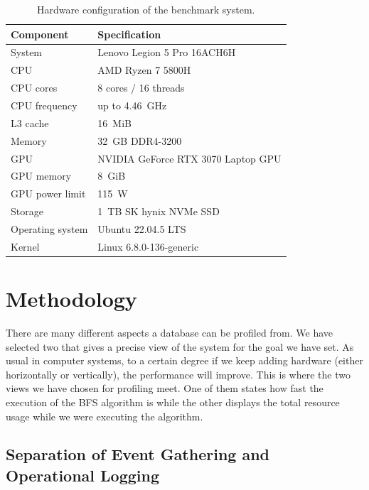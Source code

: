 \documentclass[11pt,a4paper]{article}
\begin{document}
\begin{table}[htbp]
    \centering
    \caption{Hardware configuration of the benchmark system.}
    \label{tab:benchmark-hardware}
    \begin{tabular}{ll}
        \hline
        \textbf{Component} & \textbf{Specification} \\
        \hline
        System      & Lenovo Legion 5 Pro 16ACH6H \\
        CPU         & AMD Ryzen 7 5800H \\
        CPU cores   & 8 cores / 16 threads \\
        CPU frequency & up to 4.46~GHz \\
        L3 cache    & 16~MiB \\
        Memory      & 32~GB DDR4-3200 \\
        GPU         & NVIDIA GeForce RTX 3070 Laptop GPU \\
        GPU memory  & 8~GiB \\
        GPU power limit & 115~W \\
        Storage     & 1~TB SK hynix NVMe SSD \\
        Operating system & Ubuntu 22.04.5 LTS \\
        Kernel      & Linux 6.8.0-136-generic \\
        \hline
    \end{tabular}
\end{table}



\section{Methodology}

There are many different aspects a database can be profiled from. We have selected two that gives a precise view of the system for the goal we have set. As usual in computer systems, to a certain degree if we keep adding hardware (either horizontally or vertically), the performance will improve. This is where the two views we have chosen for profiling meet. One of them states how fast the execution of the BFS algorithm is while the other displays the total resource usage while we were executing the algorithm.


\subsection{Separation of Event Gathering and Operational Logging}
\label{subsec:event-gathering-logging}
\end{document}
